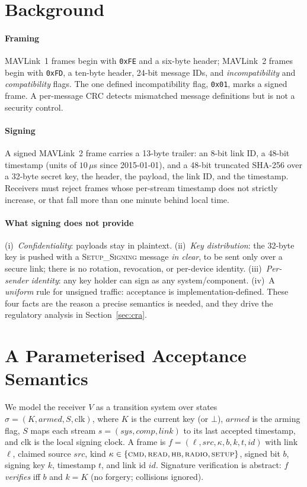 \documentclass[conference]{IEEEtran}
\newcommand{\msig}{\textsc{Setup\_Signing}}
\newcommand{\code}[1]{\texttt{#1}}
\begin{document}
\section{Background}
\label{sec:background}

\paragraph{Framing} MAVLink~1 frames begin with \code{0xFE} and a six-byte
header; MAVLink~2 frames begin with \code{0xFD}, a ten-byte header, 24-bit
message IDs, and \emph{incompatibility} and \emph{compatibility} flags. The one
defined incompatibility flag, \code{0x01}, marks a signed frame. A per-message
CRC detects mismatched message definitions but is not a security control.

\paragraph{Signing} A signed MAVLink~2 frame carries a 13-byte trailer: an
8-bit link ID, a 48-bit timestamp (units of $10\,\mu$s since 2015-01-01), and a
48-bit truncated SHA-256 over a 32-byte secret key, the header, the payload, the
link ID, and the timestamp. Receivers must reject frames whose per-stream
timestamp does not strictly increase, or that fall more than one minute behind
local time.

\paragraph{What signing does not provide} (i)~\emph{Confidentiality}: payloads
stay in plaintext. (ii)~\emph{Key distribution}: the 32-byte key is pushed with
a \msig{} message \emph{in clear}, to be sent only over a secure link; there is
no rotation, revocation, or per-device identity. (iii)~\emph{Per-sender
identity}: any key holder can sign as any system/component. (iv)~A
\emph{uniform} rule for unsigned traffic: acceptance is implementation-defined.
These four facts are the reason a precise semantics is needed, and they drive
the regulatory analysis in Section~\ref{sec:cra}.

\section{A Parameterised Acceptance Semantics}
\label{sec:model}

We model the receiver $V$ as a transition system over states
$\sigma=(K,\mathit{armed},S,\mathrm{clk})$, where $K$ is the current key (or
$\bot$), $\mathit{armed}$ is the arming flag, $S$ maps each stream
$s=(\mathit{sys},\mathit{comp},\mathit{link})$ to its last accepted timestamp,
and $\mathrm{clk}$ is the local signing clock. A frame is
$f=(\ell,\mathit{src},\kappa,b,k,t,\mathit{id})$ with link $\ell$, claimed
source $\mathit{src}$, kind $\kappa\in\{\textsc{cmd},\textsc{read},\textsc{hb},
\textsc{radio},\textsc{setup}\}$, signed bit $b$, signing key $k$, timestamp
$t$, and link id $\mathit{id}$. Signature verification is abstract: $f$
\emph{verifies} iff $b$ and $k=K$ (no forgery; collisions ignored).
\end{document}
